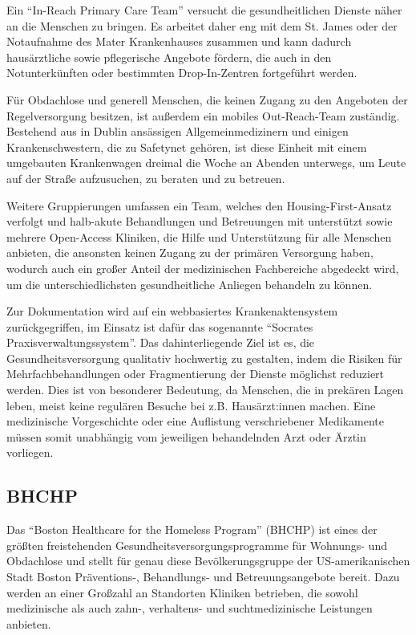 Ein \enquote{In-Reach Primary Care Team} versucht die gesundheitlichen Dienste näher an die Menschen zu bringen. Es arbeitet daher eng mit dem St. James oder der Notaufnahme des Mater Krankenhauses zusammen und kann dadurch hausärztliche sowie pflegerische Angebote fördern, die auch in den Notunterkünften oder bestimmten Drop-In-Zentren fortgeführt werden.

Für Obdachlose und generell Menschen, die keinen Zugang zu den Angeboten der Regelversorgung besitzen, ist außerdem ein mobiles Out-Reach-Team zuständig. Bestehend aus in Dublin ansässigen Allgemeinmedizinern und einigen Krankenschwestern, die zu Safetynet gehören, ist diese Einheit mit einem umgebauten Krankenwagen dreimal die Woche an Abenden unterwegs, um Leute auf der Straße aufzusuchen, zu beraten und zu betreuen.

Weitere Gruppierungen umfassen ein Team, welches den Housing-First-Ansatz verfolgt und halb-akute Behandlungen und Betreuungen mit unterstützt sowie mehrere Open-Access Kliniken, die Hilfe und Unterstützung für alle Menschen anbieten, die ansonsten keinen Zugang zu der primären Versorgung haben, wodurch auch ein großer Anteil der medizinischen Fachbereiche abgedeckt wird, um die unterschiedlichsten gesundheitliche Anliegen behandeln zu können.

Zur Dokumentation wird auf ein webbasiertes Krankenaktensystem zurückgegriffen, im Einsatz ist dafür das sogenannte \enquote{Socrates Praxisverwaltungssystem}. Das dahinterliegende Ziel ist es, die Gesundheitsversorgung qualitativ hochwertig zu gestalten, indem die Risiken für Mehrfachbehandlungen oder Fragmentierung der Dienste möglichst reduziert werden. Dies ist von besonderer Bedeutung, da Menschen, die in prekären Lagen leben, meist keine regulären Besuche bei z.B. Hausärzt:innen machen. Eine medizinische Vorgeschichte oder eine Auflistung verschriebener Medikamente müssen somit unabhängig vom jeweiligen behandelnden Arzt oder Ärztin vorliegen. \nocite{Safetynet}

\subsection{BHCHP}

Das \enquote{Boston Healthcare for the Homeless Program} (BHCHP) ist eines der größten freistehenden Gesundheitsversorgungsprogramme für Wohnungs- und Obdachlose und stellt für genau diese Bevölkerungsgruppe der US-amerikanischen Stadt Boston Präventions-, Behandlungs- und Betreuungsangebote bereit. Dazu werden an einer Großzahl an Standorten Kliniken betrieben, die sowohl medizinische als auch zahn-, verhaltens- und suchtmedizinische Leistungen anbieten.

